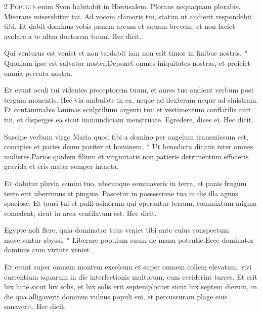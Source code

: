 \begin{multicols*}{2}
\lettrine[lines=2]{\zallmancaps \color{Blue} P}{opulus} enim Syon habitabit in Hierusalem. Plorans nequaquam plorabis. Miserans miserebitur tui. Ad vocem clamoris tui, statim ut audierit respondebit tibi. Et dabit dominus vobis panem arcum et aquam brevem, et non faciet
avolare a te ultra doctorem tuum. Hec dicit.
\begin{responsory-doxology}
{Qui venturus est veniet et non tardabit iam non erit timor in finibus nostris, * Quoniam ipse est salvator noster.}{Deponet omnes iniquitates nostras, et proiciet omnia peccata nostra.}
\end{responsory-doxology}%
\lettrine[lines=2]{\zallmancaps \color{Red} E}{t} erunt oculi tui videntes preceptorem tuum, et aures tue audient verbum post tergum monentis. Hec via ambulate in ea, neque ad dexteram neque ad sinistram. Et contaminabis laminas sculptilium argenti tui: et vestimentum conflatilis auri tui, et disperges ea sicut immundiciam menstruate. Egredere, dices ei. Hec dicit.
\begin{responsory}
{Suscipe verbum virgo Maria quod tibi a domino per angelum transmissum est, concipies et paries deum pariter et hominem, * Ut benedicta dicaris inter omnes mulieres.}{Parios quidem filium et virginitatis non patieris detrimentum efficieris gravida et eris mater semper intacta.}
\end{responsory}%
\lettrine[lines=2]{\zallmancaps \color{Blue} E}{t} dabitur pluvia semini tuo, ubicunque seminaveris in terra, et panis frugum terre erit uberrimus et pinguis. Pascetur in possessione tua in die illa agnus spaciose. Et tauri tui et pulli asinorum qui operantur terram, commixtum migma comedent, sicut in area ventilatum est. Hec dicit.
\begin{responsory}
{Egypte noli flere, quia dominator tuus veniet tibi ante cuius conspectum movebuntur abyssi, * Liberare populum suum de manu potentie.}{Ecce dominator dominus cum virtute veniet.}
\end{responsory}%
\lettrine[lines=2]{\zallmancaps \color{Red} E}{t} erunt super omnem montem excelsum et super omnem collem elevatum, rivi currentium aquarum in die interfectionis multorum, cum ceciderint turres. Et erit lux lune sicut lux solis, et lux solis erit septempliciter sicut lux septem dierum, in die qua alligaverit dominus vulnus populi sui, et percussuram plage eius sanaverit. Hec dicit.

\end{multicols*}
